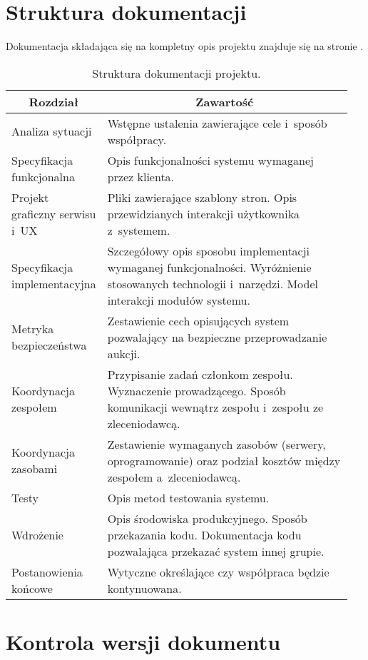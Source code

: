 \documentclass[10pt,a4paper]{article}
\begin{document}
\section{Struktura dokumentacji}
Dokumentacja składająca się na kompletny opis projektu znajduje się na stronie
\pageref{tab:struktura_dokumentacji}.
\begin{table}[p]
  \centering
  \begin{tabular}{p{0.2\linewidth} p{0.75\linewidth}}
    \toprule
    \multicolumn{1}{c}{\bf Rozdział} & \multicolumn{1}{c}{\bf Zawartość} \\
    \midrule
    Analiza sytuacji &
    Wstępne ustalenia zawierające cele i~sposób współpracy. \\
    \midrule
    Specyfikacja funkcjonalna &
    Opis funkcjonalności systemu wymaganej przez klienta. \\
    \midrule
    Projekt graficzny serwisu i~UX &
    Pliki zawierające szablony stron. Opis przewidzianych interakcji
    użytkownika z~systemem. \\
    \midrule
    Specyfikacja implementacyjna &
    Szczegółowy opis sposobu implementacji wymaganej funkcjonalności.
    Wyróżnienie stosowanych technologii i~narzędzi. Model interakcji modułów
    systemu. \\
    \midrule
    Metryka bezpieczeństwa &
    Zestawienie cech opisujących system pozwalający na bezpieczne
    przeprowadzanie aukcji. \\
    \midrule
    Koordynacja zespołem &
    Przypisanie zadań członkom zespołu. Wyznaczenie prowadzącego. Sposób
    komunikacji wewnątrz zespołu i~zespołu ze zleceniodawcą. \\
    \midrule
    Koordynacja zasobami &
    Zestawienie wymaganych zasobów (serwery, oprogramowanie) oraz podział
    kosztów między zespołem a~zleceniodawcą. \\
    \midrule
    Testy &
    Opis metod testowania systemu. \\
    \midrule
    Wdrożenie &
    Opis środowiska produkcyjnego. Sposób przekazania kodu. Dokumentacja kodu
    pozwalająca przekazać system innej grupie. \\
    \midrule
    Postanowienia końcowe &
    Wytyczne określające czy współpraca będzie kontynuowana. \\
    \bottomrule
  \end{tabular}
  \label{tab:struktura_dokumentacji}
  \caption{Struktura dokumentacji projektu.}
\end{table}

\section{Kontrola wersji dokumentu}
\end{document}
